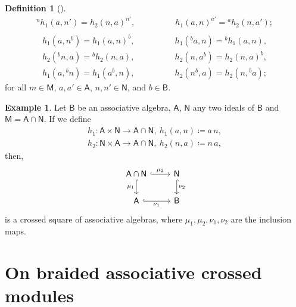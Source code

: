 \documentclass[12pt,reqno]{amsart}
\theoremstyle{plain}
\theoremstyle{definition}
\newtheorem{definition}[theorem]{Definition}
\newtheorem{example}[theorem]{Example}
\theoremstyle{remark}
\newcommand{\A}{\ensuremath{\mathsf{A}}}
\newcommand{\B}{\ensuremath{\mathsf{B}}}
\newcommand{\MM}{\ensuremath{\mathsf{M}}}
\newcommand{\NN}{\ensuremath{\mathsf{N}}}
\numberwithin{equation}{section}
\begin{document}
\begin{definition}[\cite{El}]
\begin{equation}
\begin{aligned}
  {}^n{}h_1(a,n')    =  h_2(n,a)^{n'},& \qquad  \qquad	h_1(a,n)^{a'}  = {}^a{}h_2(n,a');\\
\end{aligned}
\end{equation}
\begin{equation}\tag{SC5} \label{SC5}
	\begin{aligned}
h_1(a,n^b)= h_1(a,n)^b,&  \qquad  \qquad  h_1({}^b{}a,n) = {}^b{} h_1(a,n) ,   \\
	h_2({}^b{}n,a)  = {}^b{} h_2(n,a),&  \qquad 	  \qquad    h_2(n,a^b) = h_2(n,a)^b,  \\
 h_1(a,{}^b{}n)= h_1(a^b,n),& \qquad  \qquad  h_2(n^b,a) = h_2(n,{}^b{}a);
\end{aligned}
\end{equation}
for all $ m \in \MM,  \, a,a'\in \A, \,  n,n' \in \NN$,  and $ b \in \B $.
\end{definition}

\begin{example} Let $\B$ be an associative algebra, $\A$, $\NN$  any two ideals of $\B$ and $\MM = \A \cap \NN$. If we define
	\begin{align*}
		h_1 \colon \A \times \NN \to \A \cap \NN, \ h_1(a,n) \coloneqq a \,n,\\
		h_2 \colon \NN  \times \A \to \A \cap \NN, \ h_2(n,a) \coloneqq n \, a,
	\end{align*}
	then, 
	\[	
	\begin{tikzcd}
		\A \cap \NN \arrow[d,"\mu_1", hook, swap] \arrow[r, hook,"\mu_2"]  & \NN \arrow[d,hook,"\nu_2"] \\
		\A \arrow[r,hook,"\nu_1",swap]                     & \B           
	\end{tikzcd} 
	\]
is a crossed square of associative algebras, where $\mu_1,\mu_2,\nu_1,\nu_2$ are the inclusion maps.
\end{example}


\section{On braided  associative crossed modules}\label{S:BCM}
\end{document}
